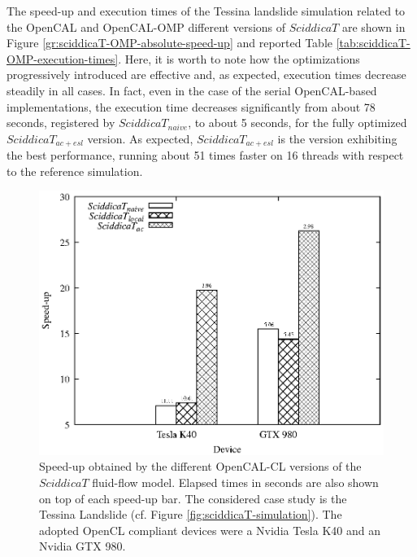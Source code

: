 The speed-up and execution times of the Tessina landslide
simulation related to the OpenCAL and OpenCAL-OMP different
versions of $SciddicaT$ are shown in Figure
\ref{gr:sciddicaT-OMP-absolute-speed-up} and reported Table \ref{tab:sciddicaT-OMP-execution-times}. Here, it is worth to
note how the optimizations progressively introduced are effective
and, as expected, execution times decrease steadily in all
cases. In fact, even in the case of the serial OpenCAL-based
implementations, the execution time decreases significantly from
about 78 seconds, registered by $SciddicaT_{naive}$, to about 5
seconds, for the fully optimized $SciddicaT_{ac+esl}$ version. As
expected, $SciddicaT_{ac+esl}$ is the version exhibiting the best
performance, running about 51 times faster on 16 threads with
respect to the reference simulation.

\begin{figure}
	\begin{center}
		\includegraphics[width=1.0\textwidth]{./images/opencal/Figure08_new}
		\caption{Speed-up obtained by the different OpenCAL-CL
			versions of the $SciddicaT$ fluid-flow model. Elapsed times
			in seconds are also shown on top of each speed-up bar. The
			considered case study is the Tessina Landslide (cf. Figure
			\ref{fig:sciddicaT-simulation}). The adopted OpenCL
			compliant devices were a Nvidia Tesla K40 and an Nvidia GTX
			980.}
		\label{gr:sciddicaT-CL-absolute-speed-up}
	\end{center}
\end{figure}

